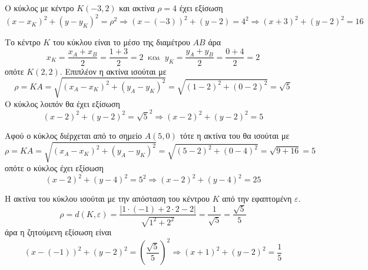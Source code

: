 \begin{alist}
\item Ο κύκλος με κέντρο $ K(-3,2) $ και ακτίνα $ \rho=4 $ έχει εξίσωση
\[ (x-x_K)^2+(y-y_K)^2=\rho^2\Rightarrow(x-(-3))^2+(y-2)=4^2\Rightarrow (x+3)^2+(y-2)^2=16 \]
\item Το κέντρο $ K $ του κύκλου είναι το μέσο της διαμέτρου $ AB $ άρα
\[ x_K=\frac{x_A+x_B}{2}=\frac{1+3}{2}=2\ \text{ και }\ y_K=\frac{y_A+y_B}{2}=\frac{0+4}{2}=2 \]
οπότε $ K(2,2) $. Επιπλέον η ακτίνα ισούται με 
\[ \rho=KA=\sqrt{(x_A-x_K)^2+(y_A-y_K)^2}=\sqrt{(1-2)^2+(0-2)^2}=\sqrt{5} \]
Ο κύκλος λοιπόν θα έχει εξίσωση
\[ (x-2)^2+(y-2)^2=\sqrt{5}^2\Rightarrow (x-2)^2+(y-2)^2=5 \]
\item Αφού ο κύκλος διέρχεται από το σημείο $ A(5,0) $ τότε η ακτίνα του θα ισούται με
\[ \rho=KA=\sqrt{(x_A-x_K)^2+(y_A-y_K)^2}=\sqrt{(5-2)^2+(0-4)^2}=\sqrt{9+16}=5 \]
οπότε ο κύκλος έχει εξίσωση
\[ (x-2)^2+(y-4)^2=5^2\Rightarrow (x-2)^2+(y-4)^2=25 \]
\item Η ακτίνα του κύκλου ισούται με την απόσταση του κέντρου $ K $ από την εφαπτομένη $ \varepsilon $.
\[ \rho=d(K,\varepsilon)=\frac{|1\cdot(-1)+2\cdot 2-2|}{\sqrt{1^2+2^2}}=\frac{1}{\sqrt{5}}=\frac{\sqrt{5}}{5} \]
άρα η ζητούμενη εξίσωση είναι
\[ (x-(-1))^2+(y-2)^2=\left(\frac{\sqrt{5}}{5}\right)^2\Rightarrow (x+1)^2+(y-2)^2=\frac{1}{5} \]
\end{alist}
